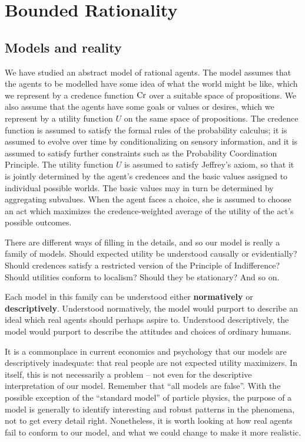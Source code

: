 \chapter{Bounded Rationality}

\section{Models and reality}

We have studied an abstract model of rational agents. The model
assumes that the agents to be modelled have some idea of what the
world might be like, which we represent by a credence function $\text{Cr}$
over a suitable space of propositions. We also assume that the agents
have some goals or values or desires, which we represent by a utility
function $U$ on the same space of propositions. The credence function
is assumed to satisfy the formal rules of the probability calculus; it
is assumed to evolve over time by conditionalizing on sensory
information, and it is assumed to satisfy further constraints such as
the Probability Coordination Principle. The utility function $U$ is
assumed to satisfy Jeffrey's axiom, so that it is jointly determined
by the agent's credences and the basic values assigned to individual
possible worlds. The basic values may in turn be determined by
aggregating subvalues. When the agent faces a choice, she is assumed
to choose an act which maximizes the credence-weighted average of the
utility of the act's possible outcomes.

There are different ways of filling in the details, and so our model
is really a family of models. Should expected utility be understood
causally or evidentially? Should credences satisfy a restricted
version of the Principle of Indifference? Should utilities conform to
localism?  Should they be stationary? And so on.

Each model in this family can be understood either
\textbf{normatively} or \textbf{descriptively}. Understood
normatively, the model would purport to describe an ideal which real
agents should perhaps aspire to. Understood descriptively, the model
would purport to describe the attitudes and choices of ordinary
humans.

It is a commonplace in current economics and psychology that our
models are descriptively inadequate: that real people are not expected
utility maximizers. In itself, this is not necessarily a problem --
not even for the descriptive interpretation of our model. Remember
that ``all models are false''. With the possible exception of the
``standard model'' of particle physics, the purpose of a model is
generally to identify interesting and robust patterns in the
phenomena, not to get every detail right.  Nonetheless, it is worth
looking at how real agents fail to conform to our model, and what we
could change to make it more realistic.

